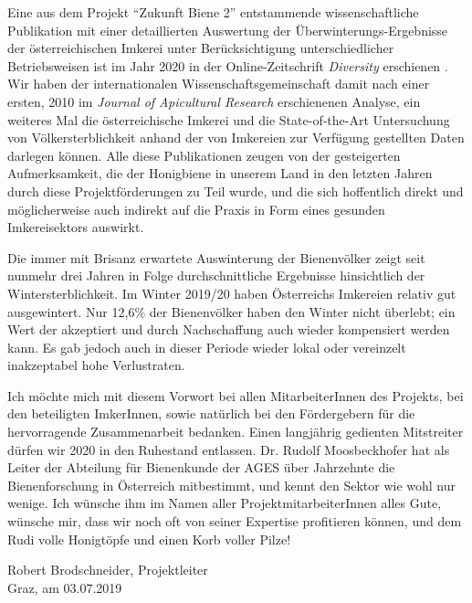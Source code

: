 Eine aus dem Projekt \enquote{Zukunft Biene 2} entstammende wissenschaftliche Publikation mit einer detaillierten Auswertung der Überwinterungs-Ergebnisse der österreichischen Imkerei unter Berücksichtigung unterschiedlicher Betriebsweisen ist im Jahr 2020 in der Online-Zeitschrift \textit{Diversity} erschienen \citep{oberreiter2020}. Wir haben der internationalen Wissenschaftsgemeinschaft damit nach einer ersten, 2010 im \textit{Journal of Apicultural Research} erschienenen Analyse, ein weiteres Mal die österreichische Imkerei und die State-of-the-Art Untersuchung von Völkersterblichkeit anhand der von Imkereien zur Verfügung gestellten Daten darlegen können. Alle diese Publikationen zeugen von der gesteigerten Aufmerksamkeit, die der Honigbiene in unserem Land in den letzten Jahren durch diese Projektförderungen zu Teil wurde, und die sich hoffentlich direkt und möglicherweise auch indirekt auf die Praxis in Form eines gesunden Imkereisektors auswirkt.

Die immer mit Brisanz erwartete Auswinterung der Bienenvölker zeigt seit nunmehr drei Jahren in Folge
durchschnittliche Ergebnisse hinsichtlich der Wintersterblichkeit. Im Winter 2019/20 haben Österreichs Imkereien relativ gut ausgewintert. Nur 12,6\% der Bienenvölker haben den Winter nicht überlebt; ein Wert der akzeptiert und durch Nachschaffung auch wieder kompensiert werden kann. Es gab jedoch auch in dieser Periode wieder lokal oder
vereinzelt inakzeptabel hohe Verlustraten.

Ich möchte mich mit diesem Vorwort bei allen MitarbeiterInnen des Projekts, bei den beteiligten ImkerInnen, sowie natürlich bei den Fördergebern für die hervorragende Zusammenarbeit bedanken.
Einen langjährig gedienten Mitstreiter dürfen wir 2020 in den Ruhestand entlassen. Dr. Rudolf Moosbeckhofer hat als Leiter der Abteilung für Bienenkunde der AGES über Jahrzehnte die Bienenforschung in Österreich mitbestimmt, und kennt den Sektor wie wohl nur wenige. Ich wünsche ihm im Namen aller
ProjektmitarbeiterInnen alles Gute, wünsche mir, dass wir noch oft von seiner Expertise profitieren können, und dem Rudi volle Honigtöpfe und einen Korb voller Pilze!

\begin{flushright}
    Robert Brodschneider, Projektleiter \\
    Graz, am 03.07.2019
\end{flushright}